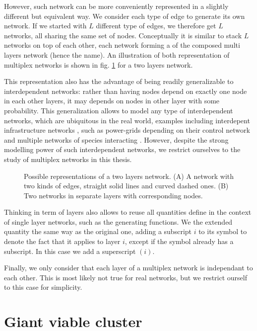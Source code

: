 \documentclass[
11pt, %
english, %
singlespacing, %
nolistspacing, %
liststotoc, %
headsepline, %
]{MastersDoctoralThesis} %
\begin{document}
However, such network can be more conveniently represented in a slightly different but equivalent way. We consider each type of edge to generate its own network. If we started with $L$ different type of edges, we therefore get $L$ networks, all sharing the same set of nodes. Conceptually it is similar to stack $L$ networks on top of each other, each network forming a  of the composed multi layers network (hence the name). An illustration of both representation of multiplex networks is shown in fig. \ref{Figure: Representations of multiplex networks} for a two layers network.

This representation also has the advantage of being readily generalizable to interdependent networks: rather than having nodes depend on exactly one node in each other layers, it may depends on nodes in other layer with some probability. This generalization allows to model any type of interdependent networks, which are ubiquitous in the real world, examples including interdepent infrastructure networks \cite{rinaldi2001identifying}, such as power-grids depending on their control network \cite{buldyrev2010catastrophic} and multiple networks of species interacting \cite{pocock2012robustness}. However, despite the strong modelling power of such interdependent networks, we restrict ourselves to the study of multiplex networks in this thesis.

\begin{figure}
	
	\caption{Possible representations of a two layers network. (A) A network with two kinds of edges, straight solid lines and curved dashed ones. (B) Two networks in separate layers with corresponding nodes.}
	\label{Figure: Representations of multiplex networks}
\end{figure}

Thinking in term of layers also allows to reuse all quantities define in the context of single layer networks, such as the generating functions. We the extended quantity the same way as the original one, adding a subscript $i$ to its symbol to denote the fact that it applies to layer $i$, except if the symbol already has a subscript. In this case we add a superscript $(i)$.

Finally, we only consider that each layer of a multiplex network is independant to each other. This is most likely not true for real networks, but we restrict ourself to this case for simplicity.

\section{Giant viable cluster}
\label{Section: Giant Viable Cluster}
\end{document}
